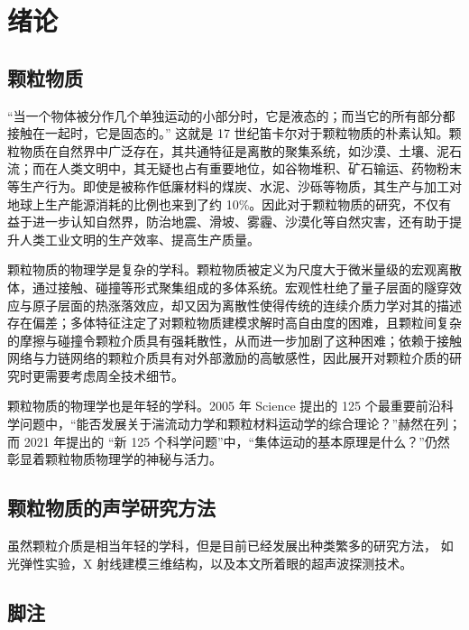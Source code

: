 
\chapter{绪论}

\section{颗粒物质}

“当一个物体被分作几个单独运动的小部分时，它是液态的；而当它的所有部分都接触在一起时，它是固态的。” 这就是 17 世纪笛卡尔对于颗粒物质的朴素认知。颗粒物质在自然界中广泛存在，其共通特征是离散的聚集系统，如沙漠、土壤、泥石流；而在人类文明中，其无疑也占有重要地位，如谷物堆积、矿石输运、药物粉末等生产行为。即使是被称作低廉材料的煤炭、水泥、沙砾等物质，其生产与加工对地球上生产能源消耗的比例也来到了约 \num{10}\%\cite{duran2000sands}。因此对于颗粒物质的研究，不仅有益于进一步认知自然界，防治地震、滑坡、雾霾、沙漠化等自然灾害，还有助于提升人类工业文明的生产效率、提高生产质量。

颗粒物质的物理学是复杂的学科。颗粒物质被定义为尺度大于微米量级的宏观离散体，通过接触、碰撞等形式聚集组成的多体系统。宏观性杜绝了量子层面的隧穿效应与原子层面的热涨落效应，却又因为离散性使得传统的连续介质力学对其的描述存在偏差\cite{RevModPhys.71.435}；多体特征注定了对颗粒物质建模求解时高自由度的困难，且颗粒间复杂的摩擦与碰撞令颗粒介质具有强耗散性，从而进一步加剧了这种困难；依赖于接触网络与力链网络的颗粒介质具有对外部激励的高敏感性，因此展开对颗粒介质的研究时更需要考虑周全技术细节。

颗粒物质的物理学也是年轻的学科。2005 年 Science 提出的 125 个最重要前沿科学问题\cite{doi:10.1126/science.309.5731.78b}中，“能否发展关于湍流动力学和颗粒材料运动学的综合理论？”赫然在列；而 2021 年提出的 “新 125 个科学问题”\cite{sanders2021125}中，“集体运动的基本原理是什么？”仍然彰显着颗粒物质物理学的神秘与活力。

\section{颗粒物质的声学研究方法}

虽然颗粒介质是相当年轻的学科，但是目前已经发展出种类繁多的研究方法， 如光弹性实验，X 射线建模三维结构，以及本文所着眼的超声波探测技术。


\section{脚注}

